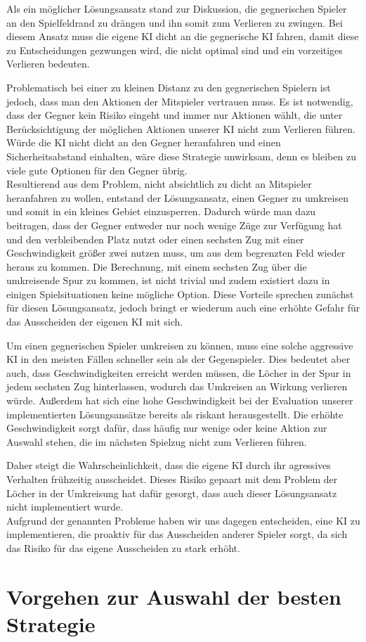 Als ein möglicher Lösungsansatz stand zur Diskussion, die gegnerischen Spieler an den Spielfeldrand zu drängen und ihn somit
zum Verlieren zu zwingen.
Bei diesem Ansatz muss die eigene KI dicht an die gegnerische \ac{KI} fahren, damit diese zu Entscheidungen gezwungen
wird, die nicht optimal sind und ein vorzeitiges Verlieren bedeuten.

Problematisch bei einer zu kleinen Distanz zu den gegnerischen Spielern ist jedoch, dass man den Aktionen der Mitspieler
vertrauen muss.
Es ist notwendig, dass der Gegner kein Risiko eingeht und immer nur Aktionen wählt, die unter Berücksichtigung der
möglichen Aktionen unserer \ac{KI} nicht zum Verlieren führen.
Würde die \ac{KI} nicht dicht an den Gegner heranfahren und einen Sicherheitsabstand einhalten, wäre diese Strategie
unwirksam, denn es bleiben zu viele gute Optionen für den Gegner übrig. \\

Resultierend aus dem Problem, nicht absichtlich zu dicht an Mitspieler heranfahren zu wollen, entstand der Lösungsansatz,
einen Gegner zu umkreisen und somit in ein kleines Gebiet einzusperren.
Dadurch würde man dazu beitragen, dass der Gegner entweder nur noch wenige Züge zur Verfügung hat und den verbleibenden
Platz nutzt oder einen sechsten Zug mit einer Geschwindigkeit größer zwei nutzen muss, um aus dem begrenzten Feld
wieder heraus zu kommen.
Die Berechnung, mit einem sechsten Zug über die umkreisende Spur zu kommen, ist nicht trivial und zudem existiert dazu in
einigen Spielsituationen keine mögliche Option.
Diese Vorteile sprechen zunächst für diesen Lösungsansatz, jedoch bringt er wiederum auch eine erhöhte Gefahr für das
Ausscheiden der eigenen \ac{KI} mit sich.

Um einen gegnerischen Spieler umkreisen zu können, muss eine solche aggressive \ac{KI} in den meisten Fällen schneller sein als
der Gegenspieler.
Dies bedeutet aber auch, dass Geschwindigkeiten erreicht werden müssen, die Löcher in der Spur in jedem sechsten Zug
hinterlassen, wodurch das Umkreisen an Wirkung verlieren würde.
Außerdem hat sich eine hohe Geschwindigkeit bei der Evaluation unserer implementierten Lösungsansätze bereits als
riskant herausgestellt.
Die erhöhte Geschwindigkeit sorgt dafür, dass häufig nur wenige oder keine Aktion zur Auswahl stehen, die im
nächsten Spielzug nicht zum Verlieren führen.

Daher steigt die Wahrscheinlichkeit, dass die eigene \ac{KI} durch ihr agressives Verhalten frühzeitig ausscheidet.
Dieses Risiko gepaart mit dem Problem der Löcher in der Umkreisung hat dafür gesorgt, dass auch dieser Lösungsansatz
nicht implementiert wurde. \\

Aufgrund der genannten Probleme haben wir uns dagegen entscheiden, eine \ac{KI} zu implementieren, die proaktiv für das
Ausscheiden anderer Spieler sorgt, da sich das Risiko für das eigene Ausscheiden zu stark erhöht.

\section{Vorgehen zur Auswahl der besten Strategie}
\label{sec:vorgehen-strategieauswahl}


